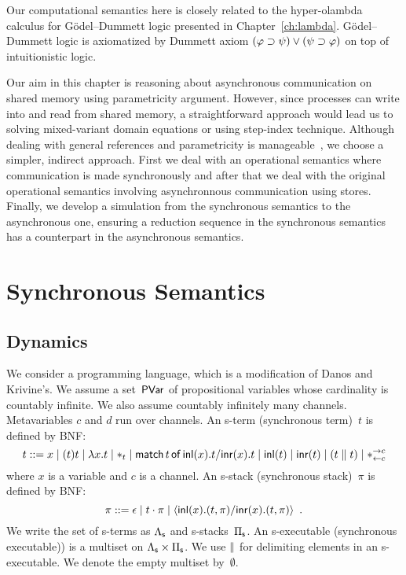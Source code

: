 Our computational semantics here is closely related to
the hyper-olambda calculus for G\"odel--Dummett logic presented in
Chapter~\ref{ch:lambda}.
G\"odel--Dummett logic is axiomatized by Dummett axiom $(\varphi\supset\psi)\lor(\psi\supset\varphi)$
on top of intuitionistic logic.  

Our aim in this chapter is reasoning about asynchronous communication on
shared memory using parametricity argument.
However, since processes can write into and read from shared memory,
a straightforward approach would lead us to solving mixed-variant domain
equations or using step-index technique.
Although dealing with general references and parametricity
is manageable~\citep{birkedal2009relational},
we choose a simpler, indirect approach.
First we deal with an operational semantics where communication is made
synchronously and after that we deal with the original operational
semantics involving asynchronnous communication using stores.
Finally, we develop a simulation from the synchronous semantics to the
asynchronous one, ensuring a reduction sequence in the synchronous
semantics has a counterpart in the asynchronous semantics.

\section{Synchronous Semantics}
\label{sec:sync}

\subsection{Dynamics}
We consider a programming language, which is a modification of
Danos and Krivine's.
We assume a set~$\mathsf{PVar}$ of propositional variables whose cardinality is
countably infinite.
We also assume countably infinitely many channels.
Metavariables $c$ and $d$ run over channels.
An s-term (synchronous term)~$t$ is defined by BNF:
\[
 t::= x
 \mid (t)t
 \mid \lambda x.t
 \mid \ast_t
 \mid \mathsf{match}\,{t}\,\mathsf{of}\, \mathsf{inl}({x}). {t}/ \mathsf{inr}({x}). {t}
 \mid \mathsf{inl}({t})
 \mid \mathsf{inr}({t})
 \mid (t\parallel t)
 \mid \ast^{\rightarrow {c}}_{\leftarrow{c}}
\]
where $x$ is a variable and $c$ is a channel.
An s-stack (synchronous stack)~$\pi$ is defined by BNF:
\[
 \pi ::= \epsilon
 \mid t\cdot \pi
 \mid \langle \mathsf{inl}({x}). ({t},{\pi})/ \mathsf{inr}({x}). ({t},{\pi})\rangle
 \enspace.
\]
We write the set of s-terms as $\Lambda_{\mathsf s}$ and s-stacks~$\Pi_{\mathsf s}$.
An s-executable (synchronous executable)) is a multiset on $\Lambda_{\mathsf s}\times\Pi_{\mathsf s}$.
We use $\parallel$ for delimiting elements in an s-executable.
We denote the empty multiset by~$\emptyset$.


